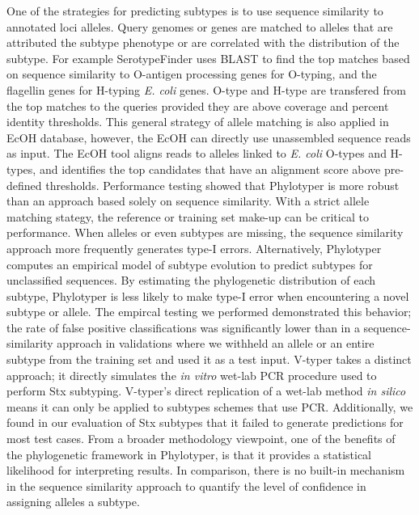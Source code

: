 \documentclass{bioinfo}
\begin{document}
One of the strategies for predicting subtypes is to use sequence similarity to annotated loci alleles.
Query genomes or genes are matched to alleles that are attributed the subtype phenotype or are correlated with the distribution of the subtype.
For example SerotypeFinder uses BLAST to find the top matches based on sequence similarity to O-antigen processing genes for  O-typing, and the flagellin genes for H-typing \textit{E. coli} genes.  
O-type and H-type are transfered from the top matches to the queries provided they are above coverage and percent identity thresholds.
This general strategy of allele matching is also applied in EcOH database, however, the EcOH can directly use unassembled sequence reads as input. The EcOH tool aligns reads to alleles linked to \textit{E. coli} O-types and H-types, and identifies the top candidates that have an alignment score above pre-defined thresholds.
Performance testing showed that Phylotyper is more robust than an approach based solely on sequence similarity.
With a strict allele matching stategy, the reference or training set make-up can be critical to performance.
When alleles or even subtypes are missing, the sequence similarity approach more frequently generates type-I errors.
Alternatively, Phylotyper computes an empirical model of subtype evolution to predict subtypes for unclassified sequences.
By estimating the phylogenetic distribution of each subtype, Phylotyper is less likely to make type-I error when encountering a novel subtype or allele. 
The empircal testing we performed demonstrated this behavior; 
the rate of false positive classifications was significantly lower than in a sequence-similarity approach in validations where we withheld an allele or an entire subtype from the training set and used it as a test input.
V-typer takes a distinct approach; it directly simulates the \textit{in vitro} wet-lab PCR procedure used to perform Stx subtyping. 
V-typer's direct replication of a wet-lab method \textit{in silico} means it can only be applied to subtypes schemes that use PCR. 
Additionally, we found in our evaluation of Stx subtypes that it failed to generate predictions for most test cases.
From a broader methodology viewpoint, one of the benefits of the phylogenetic framework in Phylotyper, is that it provides a statistical likelihood for interpreting results.
In comparison, there is no built-in mechanism in the sequence similarity approach to quantify the level of confidence in assigning alleles a subtype.
\end{document}
